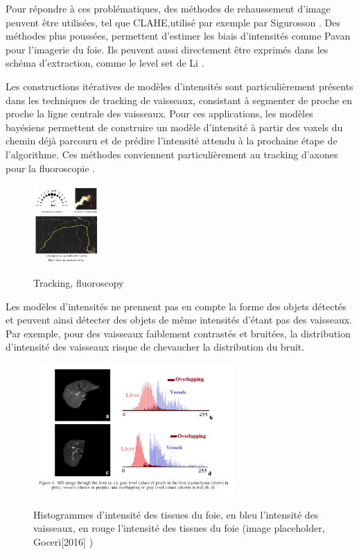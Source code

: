Pour répondre à ces problématiques, des méthodes de rehaussement d'image peuvent être utilisées, tel que CLAHE,utilisé par exemple par Sigurosson \cite{Sigurosson2014_retinal_morpho_fuzzy}. Des méthodes plus poussées, permettent d'estimer les biais d'intensités comme Pavan \cite{Pavan2018_HCC_detection} pour l'imagerie du foie. Ils peuvent aussi directement être exprimés dans les schéma d'extraction, comme le level set de Li \cite{Li2011_mri_level_set}.

Les constructions itératives de modèles d'intensités sont particulièrement présents dans les techniques de tracking de vaisseaux, consistant à segmenter de proche en proche la ligne centrale des vaisseaux. Pour ces applications, les modèles bayésiens permettent de construire un modèle d'intensité à partir des voxels du chemin déjà parcouru et de prédire l'intensité attendu à la prochaine étape de l'algorithme. Ces méthodes conviennent particulièrement au tracking d'axones pour la fluoroscopie \cite{Radojevic2015_fuzzy_logic}\cite{Radojevic2017_neurons_bayesian_tracing_density}.

\begin{figure}
  \centering
  \includegraphics[height=3cm]{Images/bayesian_tracing.png}
  \label{fig:modele bayesien}
  \caption{Tracking, fluoroscopy}
\end{figure}

Les modèles d'intensités ne prennent pas en compte la forme des objets détectés et peuvent ainsi détecter des objets de même intensités d'étant pas des vaisseaux. Par exemple, pour des vaisseaux faiblement contrastés et bruitées, la distribution d'intensité des vaisseaux risque de chevaucher la distribution du bruit.

\begin{figure}
  \centering
  \includegraphics[height=5cm]{Images/Goceri[2016].png}
  \label{fig:overlap_vessels_tissues}
  \caption{Histogrammes d'intensité des tissues du foie, en bleu l'intensité des vaisseaux, en rouge l'intensité des tissues du foie (image placeholder, Goceri[2016] ) }
\end{figure}

